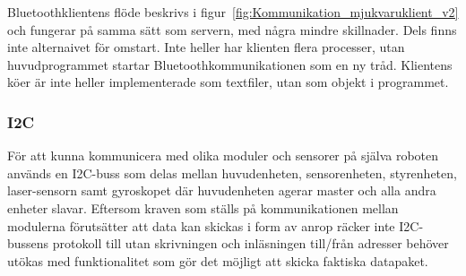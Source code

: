 \documentclass{article}
\begin{document}
Bluetoothklientens flöde beskrivs i figur~\ref{fig:Kommunikation_mjukvaruklient_v2} och fungerar på samma sätt som servern, med några mindre skillnader. Dels finns inte alternaivet för omstart. Inte heller har klienten flera processer, utan huvudprogrammet startar Bluetoothkommunikationen som en ny tråd. Klientens köer är inte heller implementerade som textfiler, utan som objekt i programmet.


\subsubsection{I2C}
\label{sec:i2c}
För att kunna kommunicera med olika moduler och sensorer på själva roboten används en I2C-buss som delas mellan huvudenheten, sensorenheten, styrenheten, laser-sensorn samt gyroskopet där huvudenheten agerar master och alla andra enheter slavar. Eftersom kraven som ställs på kommunikationen mellan modulerna förutsätter att data kan skickas i form av anrop räcker inte I2C-bussens protokoll till utan skrivningen och inläsningen till/från adresser behöver utökas med funktionalitet som gör det möjligt att skicka faktiska datapaket.
\end{document}
